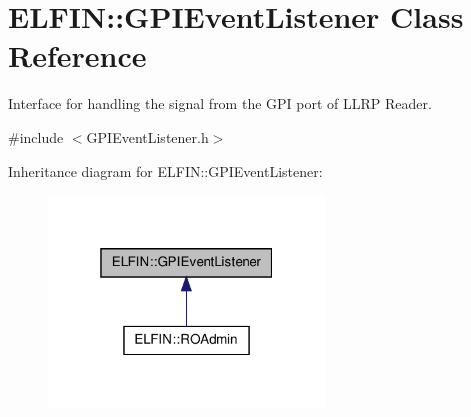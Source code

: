\hypertarget{class_e_l_f_i_n_1_1_g_p_i_event_listener}{\section{E\-L\-F\-I\-N\-:\-:G\-P\-I\-Event\-Listener Class Reference}
\label{class_e_l_f_i_n_1_1_g_p_i_event_listener}
}


Interface for handling the signal from the G\-P\-I port of L\-L\-R\-P Reader.  




{\ttfamily \#include $<$G\-P\-I\-Event\-Listener.\-h$>$}



Inheritance diagram for E\-L\-F\-I\-N\-:\-:G\-P\-I\-Event\-Listener\-:
\nopagebreak
\begin{figure}[H]
\begin{center}
\leavevmode
\includegraphics[width=208pt]{class_e_l_f_i_n_1_1_g_p_i_event_listener__inherit__graph}
\end{center}
\end{figure}
